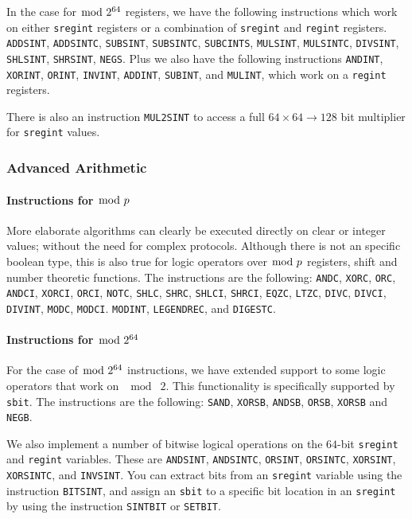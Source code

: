 In  the case for $\bmod \; 2^{64}$ registers, we have the following instructions
which work on either \verb|sregint| registers or a combination
of \verb|sregint| and \verb|regint| registers.
	\verb+ADDSINT+,
	\verb+ADDSINTC+,
	\verb+SUBSINT+,
	\verb+SUBSINTC+,
	\verb+SUBCINTS+,
	\verb+MULSINT+,
	\verb+MULSINTC+,
	\verb+DIVSINT+,
	\verb+SHLSINT+,
	\verb+SHRSINT+,
	\verb+NEGS+.
Plus we also have the following instructions
  \verb+ANDINT+,
  \verb+XORINT+,
  \verb+ORINT+,
  \verb+INVINT+,
  \verb+ADDINT+,
  \verb+SUBINT+, and
  \verb+MULINT+,
which work on a \verb|regint| registers.

There is also an instruction \verb+MUL2SINT+ to access a
full $64 \times 64 \longrightarrow 128$ bit multiplier
for \verb|sregint| values.

\subsubsection{Advanced Arithmetic}
\paragraph{Instructions for $\bmod \; p$}
More elaborate algorithms can clearly be executed directly on
clear or integer values; without the need for complex
protocols. Although there is not an specific boolean type, this is also true for logic operators over $\bmod \; p$ registers, shift and number
theoretic functions. The instructions are the following:
    \verb+ANDC+,
    \verb+XORC+,
    \verb+ORC+,
    \verb+ANDCI+,
    \verb+XORCI+,
    \verb+ORCI+,
    \verb+NOTC+,
    \verb+SHLC+,
    \verb+SHRC+,
    \verb+SHLCI+,
    \verb+SHRCI+,
    \verb+EQZC+,
    \verb+LTZC+,
    \verb+DIVC+,
    \verb+DIVCI+,
    \verb+DIVINT+,
    \verb+MODC+,
    \verb+MODCI+.
    \verb+MODINT+,
    \verb+LEGENDREC+,
and
    \verb+DIGESTC+.
\paragraph{Instructions for $\bmod \; 2^{64}$}
For the case of $\bmod \; 2^{64}$ instructions, we have extended support to some logic operators that work on $\mod \; 2$.
This functionality is specifically supported by \verb+sbit+.
The instructions are the following:
\verb+SAND+,
\verb+XORSB+,
\verb+ANDSB+,
\verb+ORSB+,
\verb+XORSB+ and
\verb+NEGB+.

We also implement a number of bitwise logical operations on the $64$-bit
\verb|sregint| and \verb|regint| variables. These are
\verb+ANDSINT+,
\verb+ANDSINTC+,
\verb+ORSINT+,
\verb+ORSINTC+,
\verb+XORSINT+,
\verb+XORSINTC+,
and
\verb+INVSINT+.
You can extract bits from an \verb|sregint| variable using the instruction
\verb+BITSINT+, and assign an \verb|sbit| to a specific bit location in
an \verb|sregint| by using the instruction \verb+SINTBIT+ or \verb+SETBIT+.

